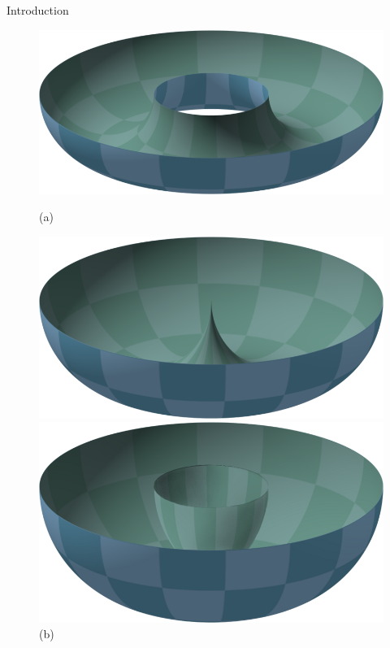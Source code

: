 \documentclass{beamer}
\newlength{\colwidth}
\begin{document}
\begin{frame}[t]
\begin{columns}[t]
\begin{column}{\colwidth}
\begin{block}{Introduction}
\bigskip
\begin{figure}[ht]
    \centering
    \begin{minipage}[b]{0.3\textwidth}
        \centering
        \includegraphics[width=\textwidth]{figures/torus_ring.png}
        \caption*{(a)}
        \label{fig:ring_torus}
    \end{minipage}
    \begin{minipage}[b]{0.3\textwidth}
        \centering
        \includegraphics[width=\textwidth]{figures/torus_horn.png}
        \caption*{(b)}
        \label{fig:horn_torus}
    \end{minipage}
    \begin{minipage}[b]{0.3\textwidth}
        \centering
        \includegraphics[width=\textwidth]{figures/torus_spindle.png}

\end{minipage}
\end{figure}
\end{block}
\end{column}
\end{columns}
\end{frame}
\end{document}
